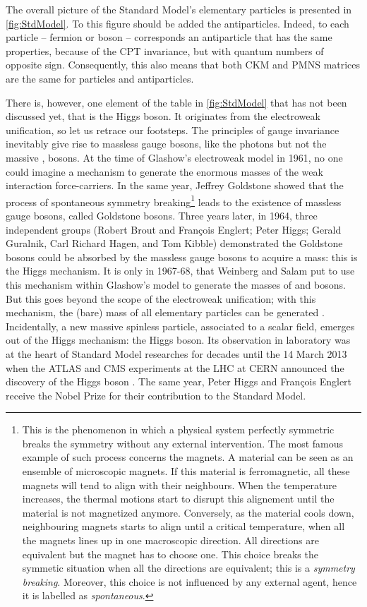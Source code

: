 The overall picture of the Standard Model's elementary particles is presented in \fig\ref{fig:StdModel}. To this figure should be added the antiparticles. Indeed, to each particle -- fermion or boson -- corresponds an antiparticle that has the same properties, because of the CPT invariance, but with quantum numbers of opposite sign. Consequently, this also means that both CKM and PMNS matrices are the same for particles and antiparticles.

There is, however, one element of the table in \fig\ref{fig:StdModel} that has not been discussed yet, that is the Higgs boson. It originates from the electroweak unification, so let us retrace our footsteps. The principles of gauge invariance inevitably give rise to massless gauge bosons, like the photons but not the massive \rmWplusminus, \rmZzero bosons. At the time of Glashow's electroweak model in 1961, no one could imagine a mechanism to generate the enormous masses of the weak interaction force-carriers. In the same year, Jeffrey Goldstone showed that the process of spontaneous symmetry breaking\footnote{This is the phenomenon in which a physical system perfectly symmetric breaks the symmetry without any external intervention. The most famous example of such process concerns the magnets. A material can be seen as an ensemble of microscopic magnets. If this material is ferromagnetic, all these magnets will tend to align with their neighbours.  When the temperature increases, the thermal motions start to disrupt this alignement until the material is not magnetized anymore. Conversely, as the material cools down, neighbouring magnets starts to align until a critical temperature, when all the magnets lines up in one macroscopic direction. All directions are equivalent but the magnet has to choose one. This choice breaks the symmetic situation when all the directions are equivalent; this is a \textit{symmetry breaking}. Moreover, this choice is not influenced by any external agent, hence it is labelled as \textit{spontaneous}.\label{footnote:SpontaneousSymmetryBreaking}} leads to the existence of massless gauge bosons, called Goldstone bosons. Three years later, in 1964, three independent groups (Robert Brout and François Englert; Peter Higgs; Gerald Guralnik, Carl Richard Hagen, and Tom Kibble) demonstrated the Goldstone bosons could be absorbed by the massless gauge bosons to acquire a mass: this is the Higgs mechanism. It is only in 1967-68, that Weinberg and Salam put to use this mechanism within Glashow's model to generate the masses of \rmWplusminus and \rmZzero bosons. But this goes beyond the scope of the electroweak unification; with this mechanism, the (bare) mass of all elementary particles can be generated \cite{s.glashowInteractionsJourneyMind1990}. Incidentally, a new massive spinless particle, associated to a scalar field, emerges out of the Higgs mechanism: the Higgs boson. Its observation in laboratory was at the heart of Standard Model researches for decades until the 14 March 2013 when the ATLAS and CMS experiments at the LHC at CERN announced the discovery of the Higgs boson \cite{cernNewResultsIndicate2023}\cite{kibbleEnglertBroutHiggsGuralnikHagenKibbleMechanismHistory2009}. The same year, Peter Higgs and François Englert receive the Nobel Prize for their contribution to the Standard Model.


